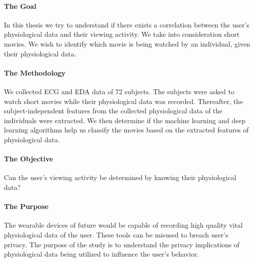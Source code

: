\paragraph{The Goal} In this thesis we try to understand if there exists a correlation between the user's physiological data and their viewing activity. We take into consideration short movies. We wish to identify which movie is being watched by an individual, given their physiological data.

\paragraph{The Methodology} \label{sec:the_methodology} We collected ECG and EDA data of 72 subjects. The subjects were asked to watch short movies while their physiological data was recorded. Thereafter, the subject-independent features from the collected physiological data of the individuals were extracted. We then determine if the machine learning and deep learning algorithms help us classify the movies based on the extracted features of physiological data.

\paragraph{The Objective} Can the user's viewing activity be determined by knowing their physiological data?

\paragraph{The Purpose} The wearable devices of future would be capable of recording high quality vital physiological data of the user. These tools can be misused to breach user's privacy. The purpose of the study is to understand the privacy implications of physiological data being utilized to influence the user's behavior.


